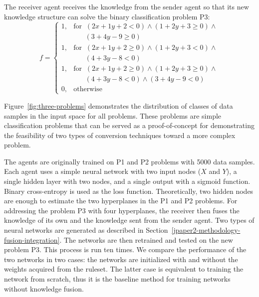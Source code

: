 \documentclass[lettersize,journal]{IEEEtran}
\begin{document}
The receiver agent receives the knowledge from the sender agent so that its new knowledge structure can solve the binary classification problem P3:
\begin{equation}
f = \begin{cases}
        1, & \mbox{for} \;\; (2x+1y+2<0) \land (1+2y+3\geq 0) \land
        \\
        & \;\;\;\;\;\; (3+4y-9\geq 0)\\
        1, & \mbox{for} \;\; (2x+1y+2\geq0) \land (1+2y+3<0) \land
        \\
        & \;\;\;\;\;\; (4+3y-8<0)\\
        1, & \mbox{for} \;\; (2x+1y+2\geq0) \land (1+2y+3\geq0) \land \\
        & \;\;\;\;\;\; (4+3y-8<0) \land (3+4y-9<0)\\
        0, & \mbox{otherwise}
    \end{cases}
\label{eq:P3}
\end{equation}

Figure~\ref{fig:three-problems} demonstrates the distribution of classes of data samples in the input space for all problems. These problems are simple classification problems that can be served as a proof-of-concept for demonstrating the feasibility of two types of conversion techniques toward a more complex problem.

\begin{figure*}[!htb]
\centering
    \hspace{1em}
    \hspace{1em}
    \caption{The distribution of data samples in three synthetic problems.}
\label{fig:three-problems}
\end{figure*}

The agents are originally trained on P1 and P2 problems with 5000 data samples. Each agent uses a simple neural network with two input nodes ($X$ and $Y$), a single hidden layer with two nodes, and a single output with a sigmoid function. Binary cross-entropy is used as the loss function. Theoretically, two hidden nodes are enough to estimate the two hyperplanes in the P1 and P2 problems. For addressing the problem P3 with four hyperplanes, the receiver then fuses the knowledge of its own and the knowledge sent from the sender agent. Two types of neural networks are generated as described in Section~\ref{jpaper2-methodology-fusion-integration}. The networks are then retrained and tested on the new problem P3. This process is run ten times. We compare the performance of the two networks in two cases: the networks are initialized with and without the weights acquired from the ruleset. The latter case is equivalent to training the network from scratch, thus it is the baseline method for training networks without knowledge fusion.
\end{document}
